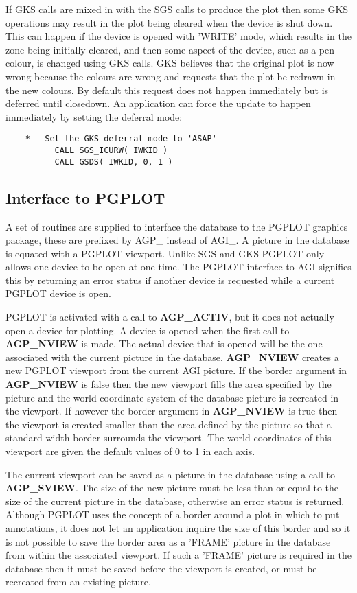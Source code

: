If GKS calls are mixed in with the SGS calls to produce the plot
then some GKS operations may result in the plot being cleared when the
device is shut down. This can happen if the device is opened with 'WRITE'
mode, which results in the zone being initially cleared, and then some
aspect of the device, such as a pen colour, is changed using GKS calls.
GKS believes that the original plot is now wrong because the colours are
wrong and requests that the plot be redrawn in the new colours.
By default this request does not happen immediately but is deferred until
closedown. An application can force the update to happen immediately by
setting the deferral mode:
\begin{verbatim}
    *   Set the GKS deferral mode to 'ASAP'
          CALL SGS_ICURW( IWKID )
          CALL GSDS( IWKID, 0, 1 )

\end{verbatim}

\subsection{Interface to PGPLOT}

A set of routines are supplied to interface the database to the PGPLOT
graphics package, these are prefixed by AGP\_ instead of AGI\_.
A picture in the database is equated with a PGPLOT viewport.
Unlike SGS and GKS PGPLOT only allows one device to be open at one
time. The PGPLOT interface to AGI signifies this by returning an error
status if another device is requested while a current PGPLOT device is
open.

PGPLOT is activated with a call to {\bf AGP\_ACTIV}, but it does not
actually open a device for plotting.
A device is opened when the first call to {\bf AGP\_NVIEW} is made.
The actual device that is opened will be the one associated with the
current picture in the database.
{\bf AGP\_NVIEW} creates a new PGPLOT viewport from the current AGI
picture.
If the border argument in {\bf AGP\_NVIEW} is false then the
new viewport fills the area specified by the picture and the world
coordinate system of the database picture is recreated in the viewport.
If however the border argument in {\bf AGP\_NVIEW} is true then
the viewport is created smaller than the area defined by the picture so
that a standard width border surrounds the viewport. The world coordinates
of this viewport are given the default values of 0 to 1 in each axis.

The current viewport can be saved as a picture in the database using a
call to {\bf AGP\_SVIEW}. The size of the new picture must be less than
or equal to the size of the current picture in the database, otherwise
an error status is returned.
Although PGPLOT uses the concept of a border around a plot in which to
put annotations, it does not let an application inquire the size of this
border and so it is not possible to save the border area as a 'FRAME'
picture in the database from within the associated viewport. If such a
'FRAME' picture is required in the database then it must be saved before
the viewport is created, or must be recreated from an existing picture.


